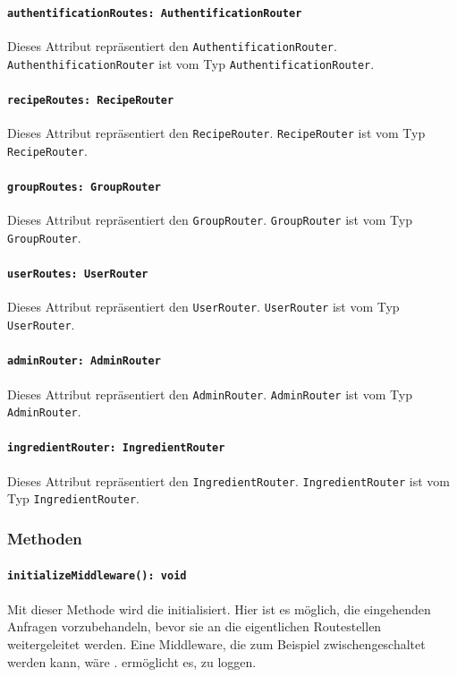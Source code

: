 \documentclass{entwurfsheft}
\begin{document}
\begin{sloppypar}
\paragraph{\texttt{authentificationRoutes: AuthentificationRouter}}
Dieses Attribut repräsentiert den \newline
\texttt{AuthentificationRouter}. \texttt{AuthenthificationRouter} ist vom Typ \texttt{AuthentificationRouter}.
\paragraph{\texttt{recipeRoutes: RecipeRouter}}
Dieses Attribut repräsentiert den \texttt{RecipeRouter}. \texttt{RecipeRouter} ist vom Typ \texttt{RecipeRouter}.
\paragraph{\texttt{groupRoutes: GroupRouter}}
Dieses Attribut repräsentiert den \texttt{GroupRouter}. \texttt{GroupRouter} ist vom Typ \texttt{GroupRouter}.
\paragraph{\texttt{userRoutes: UserRouter}}
Dieses Attribut repräsentiert den \texttt{UserRouter}. \texttt{UserRouter} ist vom Typ \texttt{UserRouter}.
\paragraph{\texttt{adminRouter: AdminRouter}}
Dieses Attribut repräsentiert den \texttt{AdminRouter}. \texttt{AdminRouter} ist vom Typ \texttt{AdminRouter}.
\paragraph{\texttt{ingredientRouter: IngredientRouter}}
Dieses Attribut repräsentiert den \texttt{IngredientRouter}. \texttt{IngredientRouter} ist vom Typ \texttt{IngredientRouter}.

\subsubsection*{Methoden}
\paragraph{\texttt{initializeMiddleware(): void}}
Mit dieser Methode wird die  initialisiert. Hier ist es möglich, die eingehenden Anfragen vorzubehandeln, bevor sie an die eigentlichen Routestellen weitergeleitet werden.
Eine Middleware, die zum Beispiel zwischengeschaltet werden kann, wäre .  ermöglicht es,  zu loggen.

\end{sloppypar}
\end{document}
